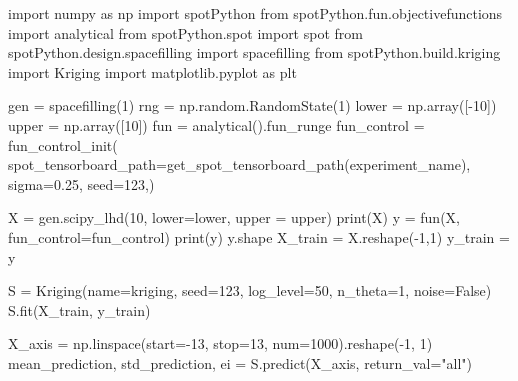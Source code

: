 \documentclass[
  letterpaper,
  DIV=11,
  numbers=noendperiod]{scrreprt}
\newenvironment{Shaded}{\begin{snugshade}}{\end{snugshade}}
\newcommand{\BuiltInTok}[1]{\textcolor[rgb]{0.00,0.23,0.31}{#1}}
\newcommand{\DecValTok}[1]{\textcolor[rgb]{0.68,0.00,0.00}{#1}}
\newcommand{\FloatTok}[1]{\textcolor[rgb]{0.68,0.00,0.00}{#1}}
\newcommand{\ImportTok}[1]{\textcolor[rgb]{0.00,0.46,0.62}{#1}}
\newcommand{\NormalTok}[1]{\textcolor[rgb]{0.00,0.23,0.31}{#1}}
\newcommand{\OperatorTok}[1]{\textcolor[rgb]{0.37,0.37,0.37}{#1}}
\newcommand{\StringTok}[1]{\textcolor[rgb]{0.13,0.47,0.30}{#1}}
\newcommand{\VariableTok}[1]{\textcolor[rgb]{0.07,0.07,0.07}{#1}}
\begin{document}
\begin{Shaded}
\begin{Highlighting}[]
\ImportTok{import}\NormalTok{ numpy }\ImportTok{as}\NormalTok{ np}
\ImportTok{import}\NormalTok{ spotPython}
\ImportTok{from}\NormalTok{ spotPython.fun.objectivefunctions }\ImportTok{import}\NormalTok{ analytical}
\ImportTok{from}\NormalTok{ spotPython.spot }\ImportTok{import}\NormalTok{ spot}
\ImportTok{from}\NormalTok{ spotPython.design.spacefilling }\ImportTok{import}\NormalTok{ spacefilling}
\ImportTok{from}\NormalTok{ spotPython.build.kriging }\ImportTok{import}\NormalTok{ Kriging}
\ImportTok{import}\NormalTok{ matplotlib.pyplot }\ImportTok{as}\NormalTok{ plt}

\NormalTok{gen }\OperatorTok{=}\NormalTok{ spacefilling(}\DecValTok{1}\NormalTok{)}
\NormalTok{rng }\OperatorTok{=}\NormalTok{ np.random.RandomState(}\DecValTok{1}\NormalTok{)}
\NormalTok{lower }\OperatorTok{=}\NormalTok{ np.array([}\OperatorTok{{-}}\DecValTok{10}\NormalTok{])}
\NormalTok{upper }\OperatorTok{=}\NormalTok{ np.array([}\DecValTok{10}\NormalTok{])}
\NormalTok{fun }\OperatorTok{=}\NormalTok{ analytical().fun\_runge}
\NormalTok{fun\_control }\OperatorTok{=}\NormalTok{ fun\_control\_init(}
\NormalTok{    spot\_tensorboard\_path}\OperatorTok{=}\NormalTok{get\_spot\_tensorboard\_path(experiment\_name),}
\NormalTok{    sigma}\OperatorTok{=}\FloatTok{0.25}\NormalTok{,}
\NormalTok{    seed}\OperatorTok{=}\DecValTok{123}\NormalTok{,)}

\NormalTok{X }\OperatorTok{=}\NormalTok{ gen.scipy\_lhd(}\DecValTok{10}\NormalTok{, lower}\OperatorTok{=}\NormalTok{lower, upper }\OperatorTok{=}\NormalTok{ upper)}
\BuiltInTok{print}\NormalTok{(X)}
\NormalTok{y }\OperatorTok{=}\NormalTok{ fun(X, fun\_control}\OperatorTok{=}\NormalTok{fun\_control)}
\BuiltInTok{print}\NormalTok{(y)}
\NormalTok{y.shape}
\NormalTok{X\_train }\OperatorTok{=}\NormalTok{ X.reshape(}\OperatorTok{{-}}\DecValTok{1}\NormalTok{,}\DecValTok{1}\NormalTok{)}
\NormalTok{y\_train }\OperatorTok{=}\NormalTok{ y}

\NormalTok{S }\OperatorTok{=}\NormalTok{ Kriging(name}\OperatorTok{=}\StringTok{\textquotesingle{}kriging\textquotesingle{}}\NormalTok{,  seed}\OperatorTok{=}\DecValTok{123}\NormalTok{, log\_level}\OperatorTok{=}\DecValTok{50}\NormalTok{, n\_theta}\OperatorTok{=}\DecValTok{1}\NormalTok{, noise}\OperatorTok{=}\VariableTok{False}\NormalTok{)}
\NormalTok{S.fit(X\_train, y\_train)}

\NormalTok{X\_axis }\OperatorTok{=}\NormalTok{ np.linspace(start}\OperatorTok{={-}}\DecValTok{13}\NormalTok{, stop}\OperatorTok{=}\DecValTok{13}\NormalTok{, num}\OperatorTok{=}\DecValTok{1000}\NormalTok{).reshape(}\OperatorTok{{-}}\DecValTok{1}\NormalTok{, }\DecValTok{1}\NormalTok{)}
\NormalTok{mean\_prediction, std\_prediction, ei }\OperatorTok{=}\NormalTok{ S.predict(X\_axis, return\_val}\OperatorTok{=}\StringTok{"all"}\NormalTok{)}


\end{Highlighting}
\end{Shaded}
\end{document}
